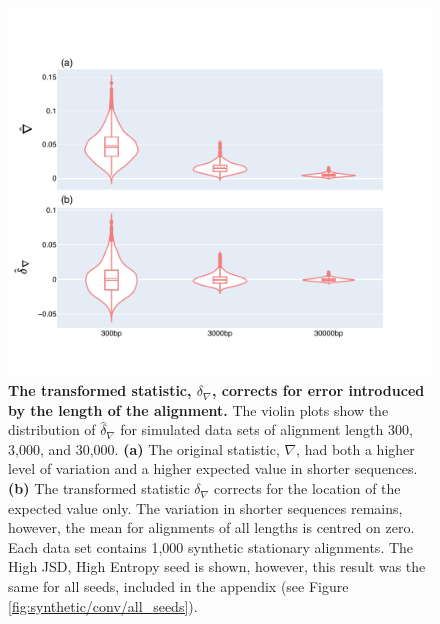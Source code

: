 \begin{figure}[htbp]
\centering
\includegraphics[width=\textwidth]{figures/plots/synthetic/d-conv-vs-conv/High JSD, High Entropy.pdf}
\caption{\textbf{The transformed statistic, $\delta_\nabla$, corrects for error introduced by the length of the alignment.} The violin plots show the distribution of $\hat \delta_\nabla$ for simulated data sets of alignment length 300, 3,000, and 30,000. \textbf{(a)} The original statistic, $\nabla$, had both a higher level of variation and a higher expected value in shorter sequences. \textbf{(b)} The transformed statistic $\delta_\nabla$ corrects for the location of the expected value only. The variation in shorter sequences remains, however, the mean for alignments of all lengths is centred on zero. Each data set contains 1,000 synthetic stationary alignments. The High JSD, High Entropy seed is shown, however, this result was the same for all seeds, included in the appendix (see Figure \ref{fig:synthetic/conv/all_seeds}). }
\label{fig:synthetic/d-conv-vs-conv/HighJSDHighEntropy}
\end{figure}
